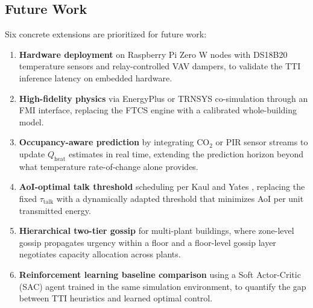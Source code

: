 \documentclass[conference]{IEEEtran}
\begin{document}
\subsection{Future Work}

Six concrete extensions are prioritized for future work:
\begin{enumerate}[]
  \item \textbf{Hardware deployment} on Raspberry Pi Zero W nodes with DS18B20
        temperature sensors and relay-controlled VAV dampers, to validate the
        TTI inference latency on embedded hardware.
  \item \textbf{High-fidelity physics} via EnergyPlus or TRNSYS co-simulation
        through an FMI interface, replacing the FTCS engine with a calibrated
        whole-building model.
  \item \textbf{Occupancy-aware prediction} by integrating CO$_2$ or PIR
        sensor streams to update $Q_{\text{heat}}$ estimates in real time,
        extending the prediction horizon beyond what temperature rate-of-change
        alone provides.
  \item \textbf{AoI-optimal talk threshold} scheduling per Kaul and Yates
        \cite{kaul2020}, replacing the fixed $\tau_{\text{talk}}$ with a
        dynamically adapted threshold that minimizes AoI per unit transmitted
        energy.
  \item \textbf{Hierarchical two-tier gossip} for multi-plant buildings, where
        zone-level gossip propagates urgency within a floor and a floor-level
        gossip layer negotiates capacity allocation across plants.
  \item \textbf{Reinforcement learning baseline comparison} using a Soft
        Actor-Critic (SAC) agent trained in the same simulation environment, to
        quantify the gap between TTI heuristics and learned optimal control.
\end{enumerate}

\end{document}

